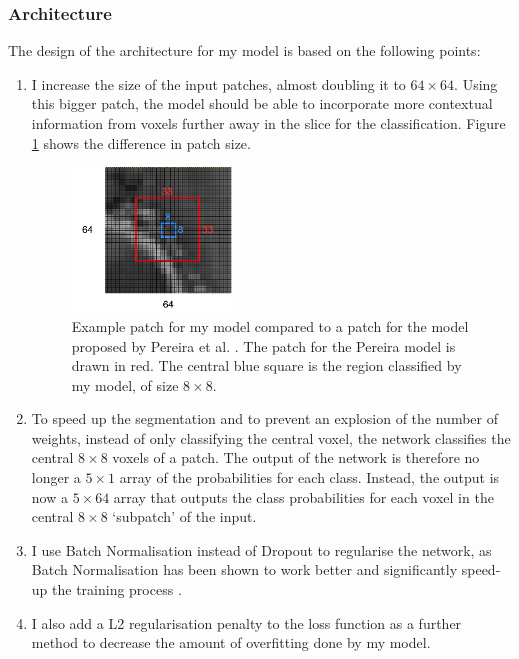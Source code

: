 \documentclass[12pt,a4paper,twoside,openright]{report}
\begin{document}
\subsubsection{Architecture}
The design of the architecture for my model is based on the following points:
\begin{enumerate}
	\item I increase the size of the input patches, almost doubling it to $64 \times 64$. Using this bigger patch, the model should be able to incorporate more contextual information from voxels further away in the slice for the classification. Figure \ref{fig:bigger_patches} shows the difference in patch size.
		\begin{figure}
			\centering
			\includegraphics[width=0.4\textwidth]{bigger_patches}
			\caption[Example patch for my model compared to a patch for the model proposed by Pereira et al.]{Example patch for my model compared to a patch for the model proposed by Pereira et al. \cite{pereira}. The patch for the Pereira model is drawn in red. The central blue square is the region classified by my model, of size $8 \times 8$.}
			\label{fig:bigger_patches}
		\end{figure}
	\item To speed up the segmentation and to prevent an explosion of the number of weights, instead of only classifying the central voxel, the network classifies the central $8 \times 8$ voxels of a patch. The output of the network is therefore no longer a $5 \times 1$ array of the probabilities for each class. Instead, the output is now a $5 \times 64$ array that outputs the class probabilities for each voxel in the central $8 \times 8$ `subpatch' of the input. 
	\item I use Batch Normalisation instead of Dropout to regularise the network, as Batch Normalisation has been shown to work better and significantly speed-up the training process \cite{batch_normalization}. 
	\item I also add a L2 regularisation penalty to the loss function as a further method to decrease the amount of overfitting done by my model.

\end{enumerate}
\end{document}
